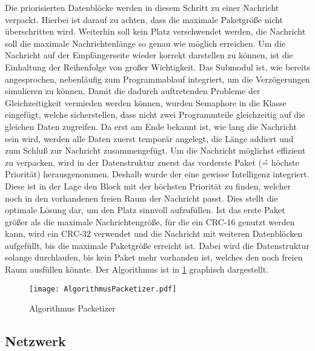 Die priorisierten Datenbl{\"o}cke werden in diesem Schritt zu einer Nachricht
verpackt. Hierbei ist darauf zu achten, dass die maximale Paketgr{\"o}{\ss}e
nicht {\"u}berschritten wird. Weiterhin soll kein Platz verschwendet werden,
\dahe die Nachricht soll die maximale Nachrichtenl{\"a}nge so genau wie
m{\"o}glich erreichen.
Um die Nachricht auf der Empf{\"a}ngerseite wieder korrekt darstellen zu k{\"o}nnen, ist
die Einhaltung der Reihenfolge von gro{\ss}er Wichtigkeit. \newline
Das Submodul ist, wie bereits angesprochen, nebenl{\"a}ufig zum Programmablauf
integriert, um die Verz{\"o}gerungen simulieren zu k{\"o}nnen. Damit die
dadurch auftretenden Probleme der Gleichzeitigkeit vermieden werden k{\"o}nnen,
wurden Semaphore in die Klasse 
eingef{\"u}gt, welche sicherstellen, dass nicht zwei Programmteile gleichzeitig auf
die gleichen Daten zugreifen. Da erst am Ende bekannt ist, wie lang die
Nachricht sein wird, werden alle Daten zuerst tempor{\"a}r angelegt, die
L{\"a}nge addiert und zum Schlu{\ss} zur Nachricht zusammengef{\"u}gt.
Um die Nachricht m{\"o}glichst effizient zu verpacken, wird in der
Datenstruktur  zuerst das vorderste Paket
(\^= h{\"o}chste Priorit{\"a}t) herausgenommen. Deshalb wurde der
 eine gewisse Intelligenz integriert.
Diese ist in der Lage den Block mit der h{\"o}chsten Priorit{\"a}t zu finden, welcher
noch in den vorhandenen freien Raum der Nachricht passt. Dies stellt die
optimale L{\"o}sung dar, um den Platz sinnvoll aufzuf{\"u}llen. \newline 
Ist das erste Paket gr{\"o}{\ss}er als die maximale Nachrichtengr{\"o}{\ss}e,
f{\"u}r die ein CRC-16 genutzt werden kann, wird ein CRC-32 verwendet und die
Nachricht mit weiteren Datenbl{\"o}cken aufgef{\"u}llt, bis die maximale
Paketgr{\"o}ße erreicht ist. Dabei wird die Datenstruktur
 solange durchlaufen, bis kein Paket mehr vorhanden
ist, welches den noch freien Raum ausf{\"u}llen k{\"o}nnte. \newline 
Der Algorithmus ist in \ref{fig:AlgorithmusPacketizer} graphisch dargestellt.

\begin{figure}[H]
\centering
\texttt{[image: AlgorithmusPacketizer.pdf]}
\caption{Algorithmus Packetizer}
\label{fig:AlgorithmusPacketizer}
\end{figure}

\subsection{Netzwerk}

